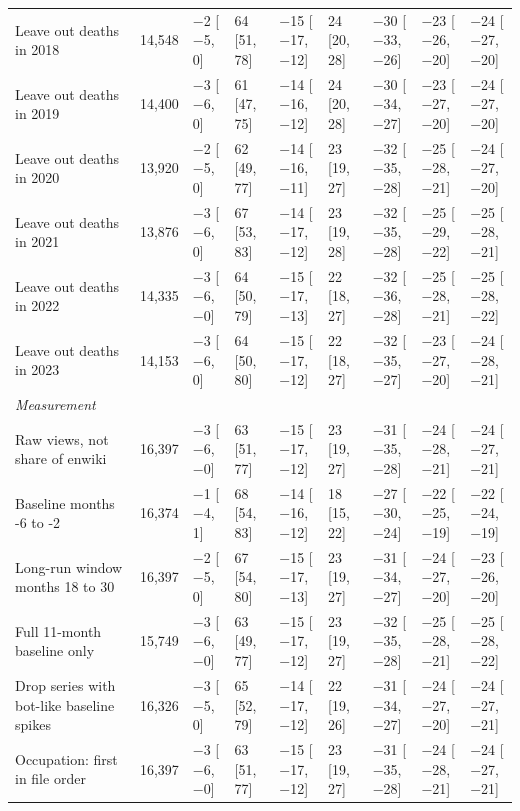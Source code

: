 \documentclass[11pt,a4paper]{article}
\begin{document}
\begin{table}[tbp]
{\begin{tabular}{p{4.4cm}rlllllll}
\quad Leave out deaths in 2018 & 14,548 & $-$2 [$-$5, 0] & 64 [51, 78] & $-$15 [$-$17, $-$12] & 24 [20, 28] & $-$30 [$-$33, $-$26] & $-$23 [$-$26, $-$20] & $-$24 [$-$27, $-$20]\\
\quad Leave out deaths in 2019 & 14,400 & $-$3 [$-$6, 0] & 61 [47, 75] & $-$14 [$-$16, $-$12] & 24 [20, 28] & $-$30 [$-$34, $-$27] & $-$23 [$-$27, $-$20] & $-$24 [$-$27, $-$20]\\
\quad Leave out deaths in 2020 & 13,920 & $-$2 [$-$5, 0] & 62 [49, 77] & $-$14 [$-$16, $-$11] & 23 [19, 27] & $-$32 [$-$35, $-$28] & $-$25 [$-$28, $-$21] & $-$24 [$-$27, $-$20]\\
\quad Leave out deaths in 2021 & 13,876 & $-$3 [$-$6, 0] & 67 [53, 83] & $-$14 [$-$17, $-$12] & 23 [19, 28] & $-$32 [$-$35, $-$28] & $-$25 [$-$29, $-$22] & $-$25 [$-$28, $-$21]\\
\quad Leave out deaths in 2022 & 14,335 & $-$3 [$-$6, $-$0] & 64 [50, 79] & $-$15 [$-$17, $-$13] & 22 [18, 27] & $-$32 [$-$36, $-$28] & $-$25 [$-$28, $-$21] & $-$25 [$-$28, $-$22]\\
\quad Leave out deaths in 2023 & 14,153 & $-$3 [$-$6, 0] & 64 [50, 80] & $-$15 [$-$17, $-$12] & 22 [18, 27] & $-$32 [$-$35, $-$27] & $-$23 [$-$27, $-$20] & $-$24 [$-$28, $-$21]\\
\multicolumn{9}{l}{\textit{Measurement}}\\
\quad Raw views, not share of enwiki & 16,397 & $-$3 [$-$6, $-$0] & 63 [51, 77] & $-$15 [$-$17, $-$12] & 23 [19, 27] & $-$31 [$-$35, $-$28] & $-$24 [$-$28, $-$21] & $-$24 [$-$27, $-$21]\\
\quad Baseline months -6 to -2 & 16,374 & $-$1 [$-$4, 1] & 68 [54, 83] & $-$14 [$-$16, $-$12] & 18 [15, 22] & $-$27 [$-$30, $-$24] & $-$22 [$-$25, $-$19] & $-$22 [$-$24, $-$19]\\
\quad Long-run window months 18 to 30 & 16,397 & $-$2 [$-$5, 0] & 67 [54, 80] & $-$15 [$-$17, $-$13] & 23 [19, 27] & $-$31 [$-$34, $-$27] & $-$24 [$-$27, $-$20] & $-$23 [$-$26, $-$20]\\
\quad Full 11-month baseline only & 15,749 & $-$3 [$-$6, $-$0] & 63 [49, 77] & $-$15 [$-$17, $-$12] & 23 [19, 27] & $-$32 [$-$35, $-$28] & $-$25 [$-$28, $-$21] & $-$25 [$-$28, $-$22]\\
\quad Drop series with bot-like baseline spikes & 16,326 & $-$3 [$-$5, 0] & 65 [52, 79] & $-$14 [$-$17, $-$12] & 22 [19, 26] & $-$31 [$-$34, $-$27] & $-$24 [$-$27, $-$20] & $-$24 [$-$27, $-$21]\\
\quad Occupation: first in file order & 16,397 & $-$3 [$-$6, $-$0] & 63 [51, 77] & $-$15 [$-$17, $-$12] & 23 [19, 27] & $-$31 [$-$35, $-$28] & $-$24 [$-$28, $-$21] & $-$24 [$-$27, $-$21]\\

\end{tabular}}
\end{table}
\end{document}
